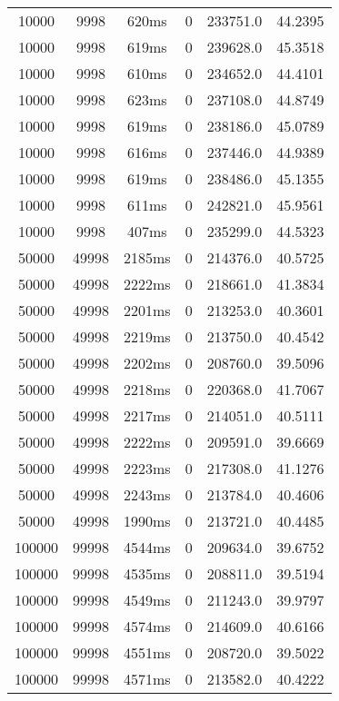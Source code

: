 \documentclass[./main.tex]{subfiles}
\begin{document}
\begin{table}
\begin{tabular}{ c | c | c | c | c | c }
        10000 & 9998 & 620ms & 0 & 233751.0 & 44.2395 \\
        10000 & 9998 & 619ms & 0 & 239628.0 & 45.3518 \\
        10000 & 9998 & 610ms & 0 & 234652.0 & 44.4101 \\
        10000 & 9998 & 623ms & 0 & 237108.0 & 44.8749 \\
        \rowcolor{lightgray} 10000 & 9998 & 619ms & 0 & 238186.0 & 45.0789 \\
        10000 & 9998 & 616ms & 0 & 237446.0 & 44.9389 \\
        10000 & 9998 & 619ms & 0 & 238486.0 & 45.1355 \\
        10000 & 9998 & 611ms & 0 & 242821.0 & 45.9561 \\
        10000 & 9998 & 407ms & 0 & 235299.0 & 44.5323 \\
        \hline
        50000 & 49998 & 2185ms & 0 & 214376.0 & 40.5725 \\
        50000 & 49998 & 2222ms & 0 & 218661.0 & 41.3834 \\
        50000 & 49998 & 2201ms & 0 & 213253.0 & 40.3601 \\
        50000 & 49998 & 2219ms & 0 & 213750.0 & 40.4542 \\
        50000 & 49998 & 2202ms & 0 & 208760.0 & 39.5096 \\
        50000 & 49998 & 2218ms & 0 & 220368.0 & 41.7067 \\
        50000 & 49998 & 2217ms & 0 & 214051.0 & 40.5111 \\
        50000 & 49998 & 2222ms & 0 & 209591.0 & 39.6669 \\
        50000 & 49998 & 2223ms & 0 & 217308.0 & 41.1276 \\
        \rowcolor{lightgray} 50000 & 49998 & 2243ms & 0 & 213784.0 & 40.4606 \\
        50000 & 49998 & 1990ms & 0 & 213721.0 & 40.4485 \\
        \hline
        \rowcolor{lightgray} 100000 & 99998 & 4544ms & 0 & 209634.0 & 39.6752 \\
        100000 & 99998 & 4535ms & 0 & 208811.0 & 39.5194 \\
        100000 & 99998 & 4549ms & 0 & 211243.0 & 39.9797 \\
        100000 & 99998 & 4574ms & 0 & 214609.0 & 40.6166 \\
        100000 & 99998 & 4551ms & 0 & 208720.0 & 39.5022 \\
        100000 & 99998 & 4571ms & 0 & 213582.0 & 40.4222 \\

\end{tabular}
\end{table}
\end{document}
